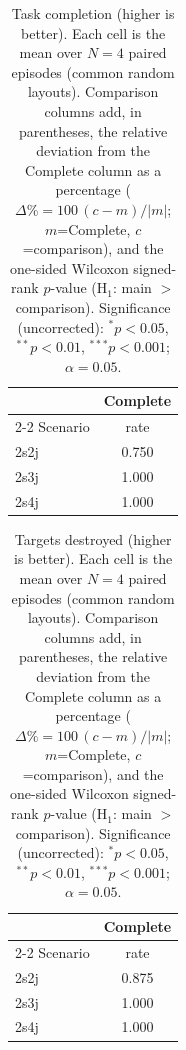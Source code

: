 
\begin{table}[ht]
  \centering
  \caption{Task completion (higher is better). Each cell is the mean over $N=4$ paired episodes (common random layouts). Comparison columns add, in parentheses, the relative deviation from the Complete column as a percentage ($\Delta\%=100\,(c-m)/|m|$; $m$=Complete, $c$=comparison), and the one-sided Wilcoxon signed-rank $p$-value (H$_1$: main $>$ comparison). Significance (uncorrected): $^{*}p<0.05$, $^{**}p<0.01$, $^{***}p<0.001$; $\alpha=0.05$.}
  \label{tab:wilcoxon-completion}
  \small
  \begin{tabular}{l c}
    \toprule
     & Complete \\
    \cmidrule(lr){2-2}
    Scenario & {rate} \\
    \midrule
    2s2j & 0.750 \\
    2s3j & 1.000 \\
    2s4j & 1.000 \\
    \bottomrule
  \end{tabular}
\end{table}

\begin{table}[ht]
  \centering
  \caption{Targets destroyed (higher is better). Each cell is the mean over $N=4$ paired episodes (common random layouts). Comparison columns add, in parentheses, the relative deviation from the Complete column as a percentage ($\Delta\%=100\,(c-m)/|m|$; $m$=Complete, $c$=comparison), and the one-sided Wilcoxon signed-rank $p$-value (H$_1$: main $>$ comparison). Significance (uncorrected): $^{*}p<0.05$, $^{**}p<0.01$, $^{***}p<0.001$; $\alpha=0.05$.}
  \label{tab:wilcoxon-targets}
  \small
  \begin{tabular}{l c}
    \toprule
     & Complete \\
    \cmidrule(lr){2-2}
    Scenario & {rate} \\
    \midrule
    2s2j & 0.875 \\
    2s3j & 1.000 \\
    2s4j & 1.000 \\
    \bottomrule
  \end{tabular}
\end{table}


